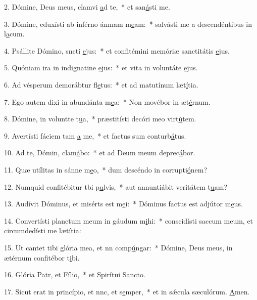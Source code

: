 2. Dómine, Deus meus, clamvi \uline{a}d te,~* et san\uline{á}sti me.\par 
3. Dómine, eduxísti ab inférno ánmam m\uline{e}am:~* salvásti me a descendéntibus in l\uline{a}cum.\par 
4. Psállite Dómino, sncti \uline{e}jus:~* et confitémini memóriæ sanctitátis \uline{e}jus.\par 
5. Quóniam ira in indignatine \uline{e}jus:~* et vita in voluntáte \uline{e}jus.\par 
6. Ad vésperum demorábtur fl\uline{e}tus:~* et ad matutínum læt\uline{í}tia.\par 
7. Ego autem dixi in abundánta m\uline{e}a:~* Non movébor in æt\uline{é}rnum.\par 
8. Dómine, in voluntte t\uline{u}a,~* præstitísti decóri meo virt\uline{ú}tem.\par 
9. Avertísti fáciem tam \uline{a} me,~* et factus sum conturb\uline{á}tus.\par 
10. Ad te, Dómin, clam\uline{á}bo:~* et ad Deum meum deprec\uline{á}bor.\par 
11. Quæ utílitas in sánne m\uline{e}o,~* dum descéndo in corrupti\uline{ó}nem?\par 
12. Numquid confitébitur tbi p\uline{u}lvis,~* aut annuntiábit veritátem t\uline{u}am?\par 
13. Audívit Dóminus, et misérts est m\uline{e}i:~* Dóminus factus est adjútor m\uline{e}us.\par 
14. Convertísti planctum meum in gáudum m\uline{i}hi:~* conscidísti saccum meum, et circumdedísti me læt\uline{í}tia:\par 
15. Ut cantet tibi glória mea, et nn comp\uline{ú}ngar:~* Dómine, Deus meus, in ætérnum confitébor t\uline{i}bi.\par 
16. Glória Patr, et F\uline{í}lio,~* et Spirítui S\uline{a}ncto.\par 
17. Sicut erat in princípio, et nnc, et s\uline{e}mper,~* et in sǽcula sæculórum. \uline{A}men.\par 
